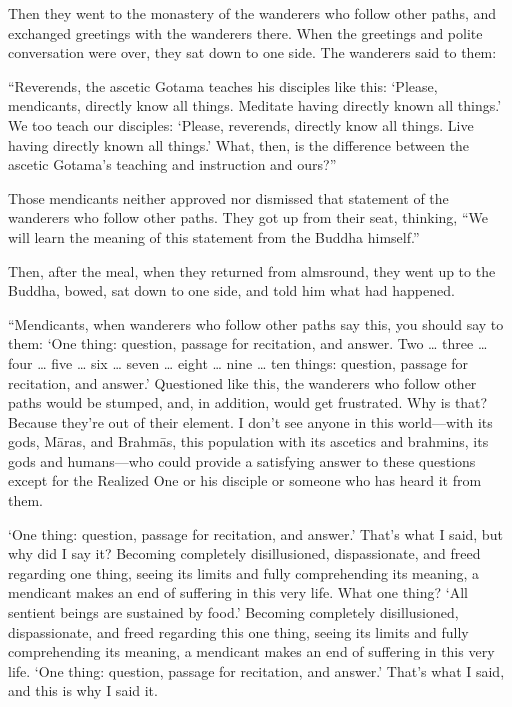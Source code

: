 \documentclass[12pt,openany]{book}%
\begin{document}
Then they went to the monastery of the wanderers who follow other paths, and exchanged greetings with the wanderers there. When the greetings and polite conversation were over, they sat down to one side. The wanderers said to them: 

“Reverends, the ascetic Gotama teaches his disciples like this: ‘Please, mendicants, directly know all things. Meditate having directly known all things.’ We too teach our disciples: ‘Please, reverends, directly know all things. Live having directly known all things.’ What, then, is the difference between the ascetic Gotama’s teaching and instruction and ours?” 

Those mendicants neither approved nor dismissed that statement of the wanderers who follow other paths. They got up from their seat, thinking, “We will learn the meaning of this statement from the Buddha himself.” 

Then, after the meal, when they returned from almsround, they went up to the Buddha, bowed, sat down to one side, and told him what had happened. 

“Mendicants, when wanderers who follow other paths say this, you should say to them: ‘One thing: question, passage for recitation, and answer. Two … three … four … five … six … seven … eight … nine … ten things: question, passage for recitation, and answer.’ Questioned like this, the wanderers who follow other paths would be stumped, and, in addition, would get frustrated. Why is that? Because they’re out of their element. I don’t see anyone in this world—with its gods, \textsanskrit{Māras}, and \textsanskrit{Brahmās}, this population with its ascetics and brahmins, its gods and humans—who could provide a satisfying answer to these questions except for the Realized One or his disciple or someone who has heard it from them. 

‘One thing: question, passage for recitation, and answer.’ That’s what I said, but why did I say it? Becoming completely disillusioned, dispassionate, and freed regarding one thing, seeing its limits and fully comprehending its meaning, a mendicant makes an end of suffering in this very life. What one thing? ‘All sentient beings are sustained by food.’ Becoming completely disillusioned, dispassionate, and freed regarding this one thing, seeing its limits and fully comprehending its meaning, a mendicant makes an end of suffering in this very life. ‘One thing: question, passage for recitation, and answer.’ That’s what I said, and this is why I said it. 
\end{document}
